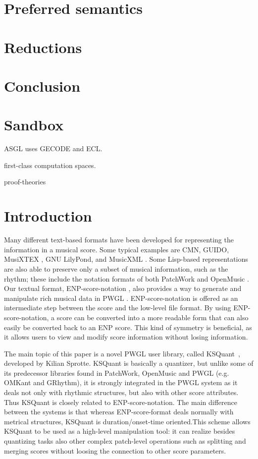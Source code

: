 \documentclass[runningheads,a4paper]{llncs}
\begin{document}
\section{Preferred semantics}\label{sec:preferred}

\section{Reductions}\label{sec:reductions}

\section{Conclusion}\label{sec:conclusion}


\section{Sandbox}\label{sec:sandbox}
ASGL\cite{asgl} uses GECODE\cite{gecode} and ECL\cite{ecl}.


first-class computation spaces\cite{Engines:97}.

proof-theories \cite{Modgil2009}


\section{Introduction}\label{old:sec:introduction}
Many different text-based formats have been developed for representing
the information in a musical score. Some typical examples are CMN,
GUIDO, MusiXTEX \cite{agon}, GNU LilyPond\cite{agon}, and
MusicXML \cite{agon}. Some Lisp-based representations are also
able to preserve only a subset of musical information, such as the
rhythm; these include the notation formats of both PatchWork \cite{agon}
and OpenMusic \cite{agon}. Our textual format, ENP-score-notation
\cite{agon}, also provides a way to generate and manipulate rich
musical data in PWGL \cite{agon}.  ENP-score-notation is offered as an
intermediate step between the score and the low-level file format. By
using ENP-score-notation, a score can be converted into a more
readable form that can also easily be converted back to an ENP
score. This kind of symmetry is beneficial, as it allows users to view
and modify score information without losing information.

The main topic of this paper is a novel PWGL user library, called
KSQuant~\cite{agon}, developed by Kilian Sprotte. KSQuant is
basically a quantizer, but unlike some of its predecessor libraries
found in PatchWork, OpenMusic and PWGL (e.g. OMKant and GRhythm), it
is strongly integrated in the PWGL system as it deals not only with
rhythmic structures, but also with other score attributes. Thus
KSQuant is closely related to ENP-score-notation. The main difference
between the systems is that whereas ENP-score-format deals normally
with metrical structures, KSQuant is duration/onset-time oriented.This
scheme allows KSQuant to be used as a high-level manipulation tool: it
can realize besides quantizing tasks also other complex patch-level
operations such as splitting and merging scores without loosing the
connection to other score parameters.
\end{document}
